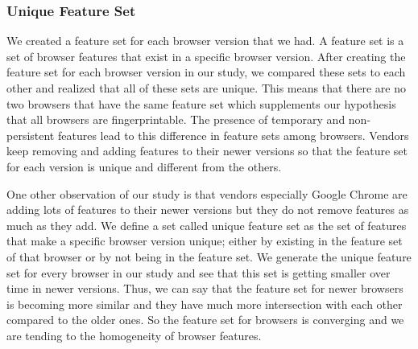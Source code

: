 \subsubsection{Unique Feature Set}
We created a feature set for each browser version that we had.
A feature set is a set of browser features that exist in a specific browser version.
After creating the feature set for each browser version in our study, we compared these sets to each other and realized that all of these sets are unique.
This means that there are no two browsers that have the same feature set which supplements our hypothesis that all browsers are fingerprintable. The presence of temporary and non-persistent features lead to this difference in feature sets among browsers. Vendors keep removing and adding features to their newer versions so that the feature set for each version is unique and different from the others.

One other observation of our study is that vendors especially Google Chrome are adding lots of features to their newer versions but they do not remove features as much as they add. We define a set called unique feature set as the set of features that make a specific browser version unique; either by existing in the feature set of that browser or by not being in the feature set. We generate the unique feature set for every browser in our study and see that this set is getting smaller over time in newer versions. Thus, we can say that the feature set for newer browsers is becoming more similar and they have much more intersection with each other compared to the older ones. So the feature set for browsers is converging and we are tending to the homogeneity of browser features. 

